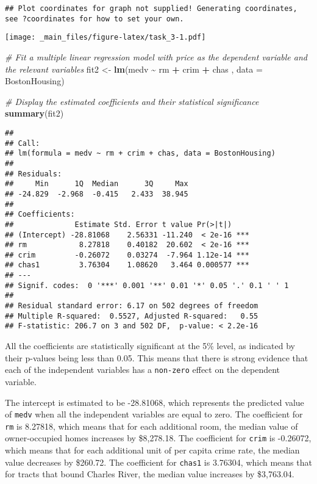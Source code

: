 \documentclass[
]{book}
\newenvironment{Shaded}{\begin{snugshade}}{\end{snugshade}}
\newcommand{\AttributeTok}[1]{\textcolor[rgb]{0.13,0.29,0.53}{#1}}
\newcommand{\CommentTok}[1]{\textcolor[rgb]{0.56,0.35,0.01}{\textit{#1}}}
\newcommand{\FunctionTok}[1]{\textcolor[rgb]{0.13,0.29,0.53}{\textbf{#1}}}
\newcommand{\NormalTok}[1]{#1}
\newcommand{\OtherTok}[1]{\textcolor[rgb]{0.56,0.35,0.01}{#1}}
\newcommand{\SpecialCharTok}[1]{\textcolor[rgb]{0.81,0.36,0.00}{\textbf{#1}}}
\begin{document}
\begin{verbatim}
## Plot coordinates for graph not supplied! Generating coordinates, see ?coordinates for how to set your own.
\end{verbatim}

\texttt{[image: \_main\_files/figure-latex/task\_3-1.pdf]}

\begin{Shaded}
\begin{Highlighting}[]
\CommentTok{\# Fit a multiple linear regression model with price as the dependent variable and the relevant variables}
\NormalTok{fit2 }\OtherTok{\textless{}{-}} \FunctionTok{lm}\NormalTok{(medv }\SpecialCharTok{\textasciitilde{}}\NormalTok{ rm }\SpecialCharTok{+}\NormalTok{ crim }\SpecialCharTok{+}\NormalTok{ chas , }\AttributeTok{data =}\NormalTok{ BostonHousing)}

\CommentTok{\# Display the estimated coefficients and their statistical significance}
\FunctionTok{summary}\NormalTok{(fit2)}
\end{Highlighting}
\end{Shaded}

\begin{verbatim}
## 
## Call:
## lm(formula = medv ~ rm + crim + chas, data = BostonHousing)
## 
## Residuals:
##     Min      1Q  Median      3Q     Max 
## -24.829  -2.968  -0.415   2.433  38.945 
## 
## Coefficients:
##              Estimate Std. Error t value Pr(>|t|)    
## (Intercept) -28.81068    2.56331 -11.240  < 2e-16 ***
## rm            8.27818    0.40182  20.602  < 2e-16 ***
## crim         -0.26072    0.03274  -7.964 1.12e-14 ***
## chas1         3.76304    1.08620   3.464 0.000577 ***
## ---
## Signif. codes:  0 '***' 0.001 '**' 0.01 '*' 0.05 '.' 0.1 ' ' 1
## 
## Residual standard error: 6.17 on 502 degrees of freedom
## Multiple R-squared:  0.5527, Adjusted R-squared:   0.55 
## F-statistic: 206.7 on 3 and 502 DF,  p-value: < 2.2e-16
\end{verbatim}

All the coefficients are statistically significant at the 5\% level, as indicated by their p-values being less than 0.05. This means that there is strong evidence that each of the independent variables has a \texttt{non-zero} effect on the dependent variable.

The intercept is estimated to be -28.81068, which represents the predicted value of \texttt{medv} when all the independent variables are equal to zero. The coefficient for \texttt{rm} is 8.27818, which means that for each additional room, the median value of owner-occupied homes increases by \$8,278.18. The coefficient for \texttt{crim} is -0.26072, which means that for each additional unit of per capita crime rate, the median value decreases by \$260.72. The coefficient for \texttt{chas1} is 3.76304, which means that for tracts that bound Charles River, the median value increases by \$3,763.04.
\end{document}
